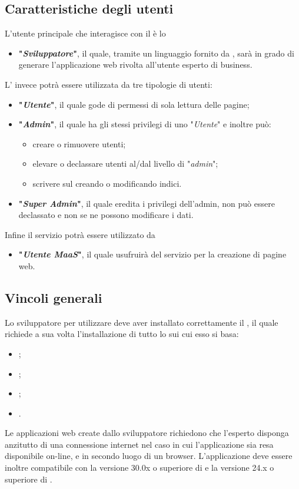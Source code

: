	\subsection{Caratteristiche degli utenti}
	L'utente principale che interagisce con il  è lo
	\begin{itemize}
		\item \textbf{"\textit{Sviluppatore}"}, il quale, tramite un linguaggio  fornito da \ProjectName{}, sarà in grado di generare l'applicazione web rivolta all'utente esperto di business.
	\end{itemize}		
	 
	L' invece potrà essere utilizzata da tre tipologie di utenti:
	\begin{itemize}
		\item \textbf{"\textit{Utente}"}, il quale gode di permessi di sola lettura delle pagine;
		\item \textbf{"\textit{Admin}"}, il quale ha gli stessi privilegi di uno "\textit{Utente}" e inoltre può:
		\begin{itemize}
			\item creare o rimuovere utenti;
			\item elevare o declassare utenti al/dal livello di "\textit{admin}";
			\item scrivere sul  creando o modificando indici.
		\end{itemize}	
		\item \textbf{"\textit{Super Admin}"}, il quale eredita i privilegi dell'admin, non può essere declassato e non se ne possono modificare i dati.
	\end{itemize}

Infine il servizio  potrà essere utilizzato da
	\begin{itemize}
		\item \textbf{"\textit{Utente MaaS}"}, il quale usufruirà del servizio per la creazione di pagine web.
	\end{itemize}
		
	\subsection{Vincoli generali}
	Lo sviluppatore per utilizzare \ProjectName{} deve aver installato correttamente il , il quale richiede a sua volta l'installazione di tutto lo  sui cui esso si basa:
	\begin{itemize}
		\item \textbf{};
		\item \textbf{};
		\item \textbf{};
		\item \textbf{}.
	\end{itemize}
	Le applicazioni web create dallo sviluppatore richiedono che l'esperto  disponga anzitutto di una connessione internet nel caso in cui l'applicazione sia resa disponibile on-line, e in secondo luogo di un browser. L'applicazione deve essere inoltre compatibile con la versione 30.0x o superiore di  e la versione 24.x o superiore di .